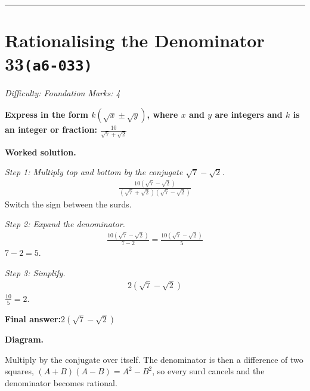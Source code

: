\documentclass[11pt]{article}
\newcommand{\question}[1]{\par\medskip\noindent\textbf{#1}\par}
\begin{document}
\medskip\hrule

\section*{Rationalising the Denominator 33\quad\small\texttt{(a6-033)}}
\textit{Difficulty: Foundation \quad\textbar\quad Marks: 4}

\question{Express in the form \( k(\sqrt{x} \pm \sqrt{y}) \), where \( x \) and \( y \) are integers and \( k \) is an integer or fraction: \( \frac{10}{\sqrt{7} + \sqrt{2}} \)}

\textbf{Worked solution.}

\textit{Step 1: Multiply top and bottom by the conjugate \( \sqrt{7} - \sqrt{2} \).}
\[\begin{gathered}
\frac{10(\sqrt{7} - \sqrt{2})}{(\sqrt{7} + \sqrt{2})(\sqrt{7} - \sqrt{2})}
\end{gathered}\]
Switch the sign between the surds.

\textit{Step 2: Expand the denominator.}
\[\begin{gathered}
\frac{10(\sqrt{7} - \sqrt{2})}{7 - 2} = \frac{10(\sqrt{7} - \sqrt{2})}{5}
\end{gathered}\]
\( 7 - 2 = 5 \).

\textit{Step 3: Simplify.}
\[\begin{gathered}
2(\sqrt{7} - \sqrt{2})
\end{gathered}\]
\( \frac{10}{5} = 2 \).

\begin{answerbox}
\textbf{Final answer:}\quad \(\displaystyle 2(\sqrt{7} - \sqrt{2})\)
\end{answerbox}
\textbf{Diagram.}

\begin{center}
\end{center}
\small Multiply by the conjugate over itself. The denominator is then a difference of two squares, $(A+B)(A-B)=A^{2}-B^{2}$, so every surd cancels and the denominator becomes rational.\normalsize
\end{document}

